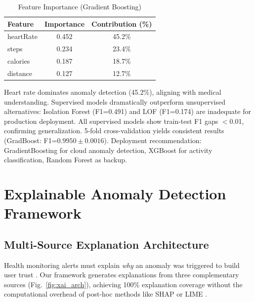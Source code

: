 \documentclass[conference]{IEEEtran}
\begin{document}
\begin{table}[H]
\centering
\caption{Feature Importance (Gradient Boosting)}
\label{tab:feature_imp}
\begin{tabular}{lcc}
\toprule
\textbf{Feature} & \textbf{Importance} & \textbf{Contribution (\%)} \\
\midrule
heartRate & 0.452 & 45.2\% \\
steps & 0.234 & 23.4\% \\
calories & 0.187 & 18.7\% \\
distance & 0.127 & 12.7\% \\
\bottomrule
\end{tabular}
\end{table}

Heart rate dominates anomaly detection (45.2\%), aligning with medical understanding. Supervised models dramatically outperform unsupervised alternatives: Isolation Forest (F1=0.491) and LOF (F1=0.174) are inadequate for production deployment. All supervised models show train-test F1 gaps $<$0.01, confirming generalization. 5-fold cross-validation yields consistent results (GradBoost: F1=$0.9950 \pm 0.0016$). Deployment recommendation: GradientBoosting for cloud anomaly detection, XGBoost for activity classification, Random Forest as backup.



\section{Explainable Anomaly Detection Framework}

\subsection{Multi-Source Explanation Architecture}
Health monitoring alerts must explain \textit{why} an anomaly was triggered to build user trust \cite{xai1}. Our framework generates explanations from three complementary sources (Fig.~\ref{fig:xai_arch}), achieving 100\% explanation coverage without the computational overhead of post-hoc methods like SHAP \cite{shap} or LIME \cite{lime}.
\end{document}
